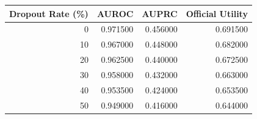 \begin{tabular}{rrrr}
\toprule
Dropout Rate (\%) & AUROC & AUPRC & Official Utility \\
\midrule
0 & 0.971500 & 0.456000 & 0.691500 \\
10 & 0.967000 & 0.448000 & 0.682000 \\
20 & 0.962500 & 0.440000 & 0.672500 \\
30 & 0.958000 & 0.432000 & 0.663000 \\
40 & 0.953500 & 0.424000 & 0.653500 \\
50 & 0.949000 & 0.416000 & 0.644000 \\
\bottomrule
\end{tabular}
